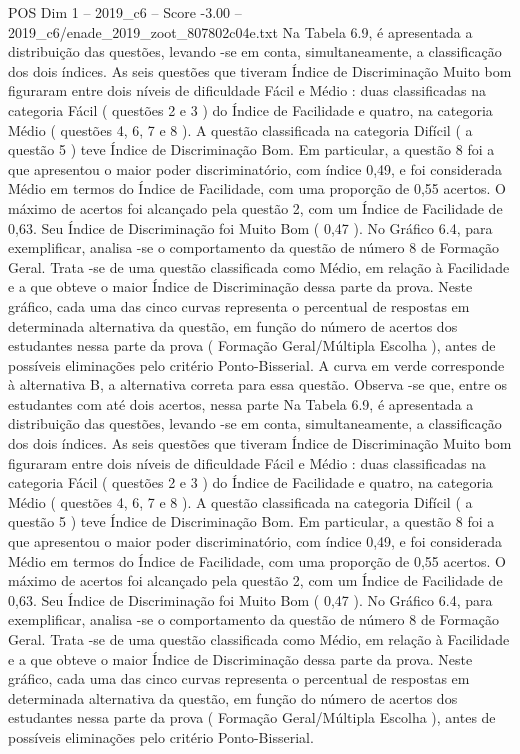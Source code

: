\begin{textsample}{POS Dim 1 – 2019\_c6 – Score -3.00 – 2019\_c6/enade\_2019\_zoot\_807802c04e.txt}
Na Tabela 6.9, é apresentada a distribuição das questões, levando -se em conta, simultaneamente, a classificação dos dois índices.
As seis questões que tiveram Índice de Discriminação Muito bom figuraram entre dois níveis de dificuldade Fácil e Médio : duas classificadas na categoria Fácil ( questões 2 e 3 ) do Índice de Facilidade e quatro, na categoria Médio ( questões 4, 6, 7 e 8 ).
A questão classificada na categoria Difícil ( a questão 5 ) teve Índice de Discriminação Bom.
Em particular, a questão 8 foi a que apresentou o maior poder discriminatório, com índice 0,49, e foi considerada Médio em termos do Índice de Facilidade, com uma proporção de 0,55 acertos.
O máximo de acertos foi alcançado pela questão 2, com um Índice de Facilidade de 0,63.
Seu Índice de Discriminação foi Muito Bom ( 0,47 ).
No Gráfico 6.4, para exemplificar, analisa -se o comportamento da questão de número 8 de Formação Geral.
Trata -se de uma questão classificada como Médio, em relação à Facilidade e a que obteve o maior Índice de Discriminação dessa parte da prova.
Neste gráfico, cada uma das cinco curvas representa o percentual de respostas em determinada alternativa da questão, em função do número de acertos dos estudantes nessa parte da prova ( Formação Geral/Múltipla Escolha ), antes de possíveis eliminações pelo critério Ponto-Bisserial.
A curva em verde corresponde à alternativa B, a alternativa correta para essa questão.
Observa -se que, entre os estudantes com até dois acertos, nessa parte Na Tabela 6.9, é apresentada a distribuição das questões, levando -se em conta, simultaneamente, a classificação dos dois índices.
As seis questões que tiveram Índice de Discriminação Muito bom figuraram entre dois níveis de dificuldade Fácil e Médio : duas classificadas na categoria Fácil ( questões 2 e 3 ) do Índice de Facilidade e quatro, na categoria Médio ( questões 4, 6, 7 e 8 ).
A questão classificada na categoria Difícil ( a questão 5 ) teve Índice de Discriminação Bom.
Em particular, a questão 8 foi a que apresentou o maior poder discriminatório, com índice 0,49, e foi considerada Médio em termos do Índice de Facilidade, com uma proporção de 0,55 acertos.
O máximo de acertos foi alcançado pela questão 2, com um Índice de Facilidade de 0,63.
Seu Índice de Discriminação foi Muito Bom ( 0,47 ).
No Gráfico 6.4, para exemplificar, analisa -se o comportamento da questão de número 8 de Formação Geral.
Trata -se de uma questão classificada como Médio, em relação à Facilidade e a que obteve o maior Índice de Discriminação dessa parte da prova.
Neste gráfico, cada uma das cinco curvas representa o percentual de respostas em determinada alternativa da questão, em função do número de acertos dos estudantes nessa parte da prova ( Formação Geral/Múltipla Escolha ), antes de possíveis eliminações pelo critério Ponto-Bisserial.

\end{textsample}
